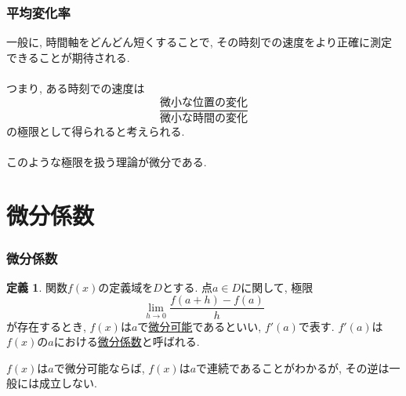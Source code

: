 \documentclass[dvipdfmx,cjk,10.2pt]{beamer}
\theoremstyle{definition}
\newtheorem{Def}[Thm]{定義}
\begin{document}


\begin{frame}
\frametitle{平均変化率}


一般に, 時間軸をどんどん短くすることで, その時刻での速度をより正確に測定できることが期待される.\\
\ \\

つまり, ある時刻での速度は
$$
\frac{\text{微小な位置の変化}}{\text{微小な時間の変化}}
$$
の極限として得られると考えられる. \\
\ \\

このような極限を扱う理論が微分である. 


\end{frame}



\section{微分係数}

\begin{frame}
\frametitle{微分係数}

\begin{Def}
関数$f(x)$の定義域を$D$とする. 
点$a \in D$に関して, 極限
$$
\lim_{h\to 0} \frac{f(a+h)-f(a)}{h}
$$
が存在するとき, $f(x)$は$a$で\underline{微分可能}であるといい, $f'(a)$で表す. 
$f'(a)$は$f(x)$の$a$における\underline{微分係数}と呼ばれる. 
\end{Def}

$f(x)$は$a$で微分可能ならば, $f(x)$は$a$で連続であることがわかるが, その逆は一般には成立しない. 


\end{frame}


\end{document}
